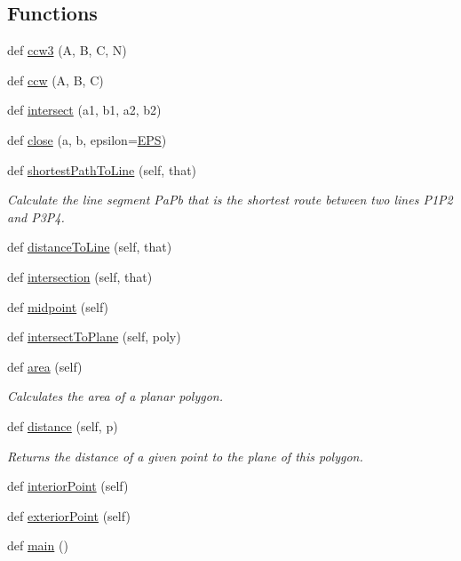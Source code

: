\subsection*{Functions}
\begin{DoxyCompactItemize}
\item 
def \hyperlink{namespacegeometry_a826edf3113b2277f596bc7927da2fd4e}{ccw3} (A, B, C, N)
\item 
def \hyperlink{namespacegeometry_ad67511f31b70990660efd63da577f482}{ccw} (A, B, C)
\item 
def \hyperlink{namespacegeometry_a3df8ee137b8d01576f14084dee3a6a91}{intersect} (a1, b1, a2, b2)
\item 
def \hyperlink{namespacegeometry_a118331eb1c38459dd57dad62f75abea5}{close} (a, b, epsilon=\hyperlink{namespacegeometry_a543db87a5e9af9e1d17146559a540276}{E\+PS})
\item 
def \hyperlink{namespacegeometry_acaccff5b694d39c9db5072c671c6568b}{shortest\+Path\+To\+Line} (self, that)
\begin{DoxyCompactList}\small\item\em Calculate the line segment Pa\+Pb that is the shortest route between two lines P1\+P2 and P3\+P4. \end{DoxyCompactList}\item 
def \hyperlink{namespacegeometry_a96071e09708da91677cc86ea91705f5e}{distance\+To\+Line} (self, that)
\item 
def \hyperlink{namespacegeometry_afe255f1239fc866c1c2c04b30c37b696}{intersection} (self, that)
\item 
def \hyperlink{namespacegeometry_aa7e72b904b344b7d45b75f3942bc618b}{midpoint} (self)
\item 
def \hyperlink{namespacegeometry_a08506b08fe50ecd6e3c7098f63178881}{intersect\+To\+Plane} (self, poly)
\item 
def \hyperlink{namespacegeometry_a7c89848bc4970d590b82641648503bd9}{area} (self)
\begin{DoxyCompactList}\small\item\em Calculates the area of a planar polygon. \end{DoxyCompactList}\item 
def \hyperlink{namespacegeometry_a9453ec6bad9d4ba50724a4df0b1a74ed}{distance} (self, p)
\begin{DoxyCompactList}\small\item\em Returns the distance of a given point to the plane of this polygon. \end{DoxyCompactList}\item 
def \hyperlink{namespacegeometry_ac7327d8cae2a771c06a0ded4c91ab4a7}{interior\+Point} (self)
\item 
def \hyperlink{namespacegeometry_ac3bf912ad06b884d2c21a3f91cf7c392}{exterior\+Point} (self)
\item 
def \hyperlink{namespacegeometry_a284499afed4bfe4096ca1c78062a16bb}{main} ()
\end{DoxyCompactItemize}
